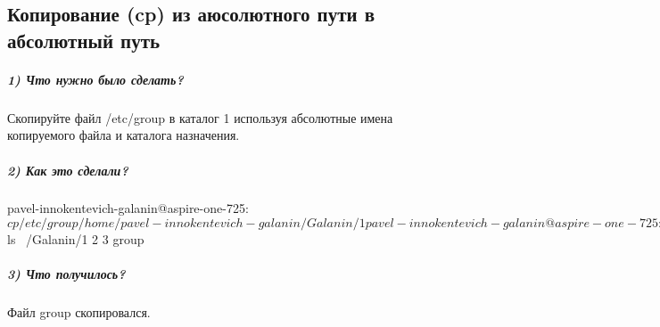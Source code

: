 \subsection{Копирование (cp) из аюсолютного пути в абсолютный путь}

\subparagraph{1) Что нужно было сделать?}

Скопируйте файл /etc/group в каталог 1 используя абсолютные имена копируемого файла и каталога назначения.

\subparagraph{2) Как это сделали?}

\begin{MyVerbatimCode}[label=Debian terminal]
pavel-innokentevich-galanin@aspire-one-725:~$ cp /etc/group /home/pavel-innokentevich-galanin/Galanin/1
pavel-innokentevich-galanin@aspire-one-725:~$ ls ~/Galanin/1
2  3  group
\end{MyVerbatimCode}

\subparagraph{3) Что получилось?}

Файл group скопировался.